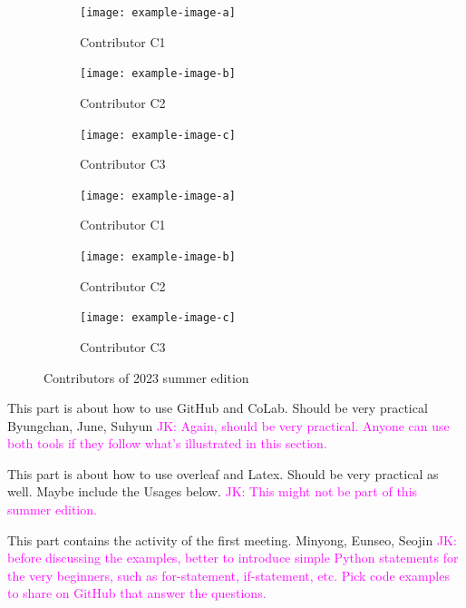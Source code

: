 \documentclass{textbook}
\begin{document}
\begin{figure}[H]
\begin{minipage}{0.9\textwidth}
  \vspace{0.5cm}

  \begin{subfigure}{0.25\textwidth}
    \texttt{[image: example-image-a]}
    \caption{Contributor C1}
  \end{subfigure}
  \hfill
  \begin{subfigure}{0.25\textwidth}
    \texttt{[image: example-image-b]}
    \caption{Contributor C2}
  \end{subfigure}
  \hfill
  \begin{subfigure}{0.25\textwidth}
    \texttt{[image: example-image-c]}
    \caption{Contributor C3}
  \end{subfigure}

  \vspace{0.5cm}

  \begin{subfigure}{0.25\textwidth}
    \texttt{[image: example-image-a]}
    \caption{Contributor C1}
  \end{subfigure}
  \hfill
  \begin{subfigure}{0.25\textwidth}
    \texttt{[image: example-image-b]}
    \caption{Contributor C2}
  \end{subfigure}
  \hfill
  \begin{subfigure}{0.25\textwidth}
    \texttt{[image: example-image-c]}
    \caption{Contributor C3}
  \end{subfigure}

  \caption{Contributors of 2023 summer edition}
  \end{minipage}
\end{figure}

\newpage

This part is about how to use GitHub and CoLab. Should be very practical
Byungchan, June, Suhyun
\textcolor{magenta}{JK: Again, should be very practical. Anyone can use both tools if they follow what's illustrated in this section.}

This part is about how to use overleaf and Latex. Should be very practical as well. Maybe include the Usages below.
\textcolor{magenta}{JK: This might not be part of this summer edition.}


This part contains the activity of the first meeting.
Minyong, Eunseo, Seojin 
\textcolor{magenta}{JK: before discussing the examples, better to introduce simple Python statements for the very beginners, such as for-statement, if-statement, etc. Pick code examples to share on GitHub that answer the questions.}
\end{document}

